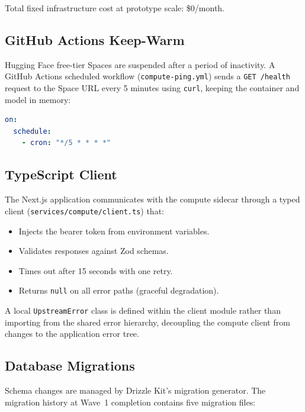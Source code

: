 \documentclass[conference]{IEEEtran}
\begin{document}
Total fixed infrastructure cost at prototype scale: \$0/month.

\subsection{GitHub Actions Keep-Warm}

Hugging Face free-tier Spaces are suspended after a period of inactivity.
A GitHub Actions scheduled workflow (\texttt{compute-ping.yml}) sends a
\texttt{GET /health} request to the Space URL every 5 minutes using
\texttt{curl}, keeping the container and model in memory:

\begin{lstlisting}[language=yaml, caption={Keep-warm workflow trigger.}]
on:
  schedule:
    - cron: "*/5 * * * *"
\end{lstlisting}

\subsection{TypeScript Client}

The Next.js application communicates with the compute sidecar through a
typed client (\texttt{services/compute/client.ts}) that:

\begin{itemize}
  \item Injects the bearer token from environment variables.
  \item Validates responses against Zod schemas.
  \item Times out after 15 seconds with one retry.
  \item Returns \texttt{null} on all error paths (graceful degradation).
\end{itemize}

A local \texttt{UpstreamError} class is defined within the client module
rather than importing from the shared error hierarchy, decoupling the
compute client from changes to the application error tree.

\subsection{Database Migrations}

Schema changes are managed by Drizzle Kit's migration generator. The
migration history at Wave~1 completion contains five migration files:
\end{document}
